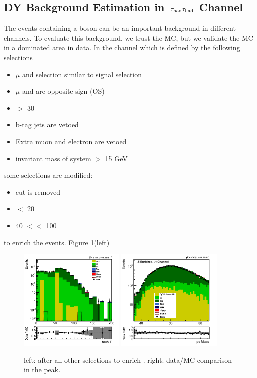 \subsection{\texorpdfstring{DY Background Estimation in $\,\tau_{\rm had}\tau_{\rm had}$ Channel}{DY Background Estimation in tau-tau Channel}}
The events containing a \Z boson can be an important background in different channels. To evaluate this background, we trust 
the MC, but we validate the MC in a \Z dominated area in data. In the \muTau channel which is defined by the following selections 
\begin{itemize}
\item $\mu$ and \Tau selection similar to signal selection
\item $\mu$ and \Tau are opposite sign (OS)
\item \MET $>$ 30 
\item b-tag jets are vetoed
\item Extra muon and electron are vetoed 
\item invariant mass of \muTau system $>$ 15 GeV
\end{itemize}
some selections are modified:
\begin{itemize}
\item \mindphifour cut is removed
\item \mttwo $<$ 20 \GeV
\item 40 $<$\tauMT $<$ 100 \GeV
\end{itemize}
to enrich the \Z events. Figure \ref{fig:ZValidation}(left)
\begin{figure}[h]
\centering
\includegraphics[width=0.45\textwidth,keepaspectratio=true]{ZValidation/tauMT_ZValidation.png}
\includegraphics[width=0.45\textwidth,keepaspectratio=true]{ZValidation/InvMass_ZValidation.png}
\caption{left: \tauMT after all other selections to enrich \Z. right: data/MC comparison in the \Z peak.}
\label{fig:ZValidation}
\end{figure}
